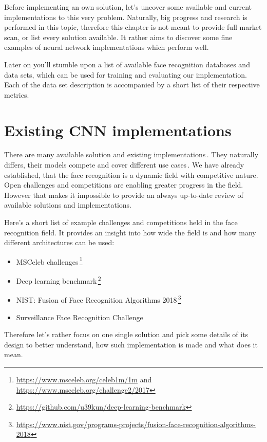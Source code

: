 Before implementing an own solution, let's uncover some available and current implementations to this very problem. Naturally, big progress and research is performed in this topic, therefore this chapter is not meant to provide full market scan, or list every solution available. It rather aims to discover some fine examples of neural network implementations which perform well.

Later on you'll stumble upon a list of available face recognition databases and data sets, which can be used for training and evaluating our implementation. Each of the data set description is accompanied by a short list of their respective metrics.

\section{Existing CNN implementations}

There are many available solution and existing implementations\,\cite{face_rec}. They naturally differs, their models compete and cover different use cases\,\cite{handbook_face}. We have already established, that the face recognition is a dynamic field with competitive nature. Open challenges and competitions are enabling greater progress in the field. However that makes it impossible to provide an always up-to-date review of available solutions and implementations.

Here's a short list of example challenges and competitions held in the face recognition field. It provides an insight into how wide the field is and how many different architectures can be used:

\begin{itemize}
    \item MSCeleb challenges\,\footnote{\url{https://www.msceleb.org/celeb1m/1m} and \url{https://www.msceleb.org/challenge2/2017}}
    \item Deep learning benchmark\,\footnote{\url{https://github.com/u39kun/deep-learning-benchmark}}
    \item NIST: Fusion of Face Recognition Algorithms 2018\,\footnote{\url{https://www.nist.gov/programs-projects/fusion-face-recognition-algorithms-2018}}
    \item Surveillance Face Recognition Challenge\,\cite{sur_challenge}
\end{itemize}

Therefore let's rather focus on one single solution and pick some details of its design to better understand, how such implementation is made and what does it mean.

